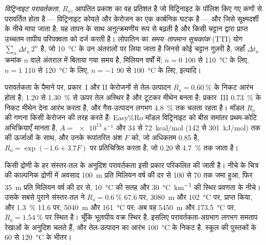 \begin{definition}\label{def:b2:energy-geology:maturity}
\emph{विट्रिनाइट परावर्तकता}, $R_o$, आपतित प्रकाश का वह प्रतिशत है जो
विट्रिनाइट के पॉलिश किए गए कणों से परावर्तित होता है --- विट्रिनाइट कोयले और केरोजन का एक कार्बनिक घटक है ---
और जिसे सूक्ष्मदर्शी के नीचे मापा जाता है; यह तापन के साथ अनुत्क्रमणीय रूप से बढ़ती है और किसी चट्टान द्वारा प्राप्त उच्चतम तापीय परिपक्वता को दर्ज करती है। लोपातिन का
\emph{समय--तापमान सूचकांक} (TTI) योग
$\sum_n \Delta t_n\,2^n$ है, जो \qty{10}{\celsius} के उन अंतरालों पर लिया जाता है जिनसे कोई चट्टान गुज़री है,
जहाँ $\Delta t_n$ क्रमांक $n$ वाले अंतराल में बिताया गया समय है, मिलियन वर्षों में; $n = 0$
100 से \qty{110}{\celsius} के लिए, $n = 1$ 110 से \qty{120}{\celsius} के लिए, $n = -1$ 90 से
\qty{100}{\celsius} के लिए, इत्यादि।
\end{definition}

परावर्तकता के पैमाने पर, प्रकार~I और II केरोजनों से तेल-उत्पादन $R_o =
\qty{0.60}{\percent}$ के निकट आरंभ होता है; 1.20 से \qty{1.30}{\percent} से ऊपर तेल अस्थिर है और टूटकर
मीथेन बनता है; प्रकार~III \qty{0.73}{\percent} के निकट मीथेन देना आरंभ करता है, और गैस-उत्पादन लगभग
\qty{4.8}{\percent} तक चलता रहता है। मॉडल $R_o$ की गणना किसी केरोजन की तरह करते हैं: Easy\%Ro मॉडल
विट्रिनाइट को बीस समांतर प्रथम-कोटि अभिक्रियाएँ मानता है, $A = \qty{e13}{s^{-1}}$ और
34 से \qty{72}{kcal/mol} (142 से \qty{301}{kJ/mol}) तक की ऊर्जाओं के साथ, और उनके रूपांतरित अंश $F$ को,
जो अधिकतम 0.85 है, $R_o = \exp(-1.6 + 3.7F)$ पर प्रतिचित्रित करता है, जो 0.20 से \qty{4.7}{\percent} तक जाता है।

किसी द्रोणी के हर संस्तर-तल के अनुदिश परावर्तकता इसी प्रकार परिकलित की जाती है। नीचे के चित्र की काल्पनिक
द्रोणी में अवसाद \qty{100}{m} प्रति मिलियन वर्ष की दर से 100 से \qty{70}{\Ma} तक जमा हुआ,
फिर \qty{35}{m} प्रति मिलियन वर्ष की दर से, \qty{10}{\celsius} की सतह और
\qty{30}{\celsius\per\km} की स्थिर प्रवणता के नीचे। उसके सबसे पुराने संस्तर-तल ने $R_o = \qty{0.6}{\percent}$
\qty{67.6}{\Ma} पर, \qty{3080}{m} और \qty{102}{\celsius} पर, प्राप्त किया, और \qty{1.3}{\percent}
\qty{11.6}{\Ma} पर, \qty{5040}{m} और \qty{161}{\celsius} पर; अब वह \qty{5450}{m} और
\qty{173.5}{\celsius} पर, $R_o = \qty{1.54}{\percent}$ पर स्थित है। चूँकि भूतापीय वक्र स्थिर है, इसलिए
परावर्तकता-अग्रभाग लगभग समताप रेखाओं के अनुदिश चलते हैं, और तेल-उत्पादन का आरंभ
\qty{100}{\celsius} के निकट है, स्कूल की पुस्तकों के 60 से \qty{120}{\celsius} के भीतर।

